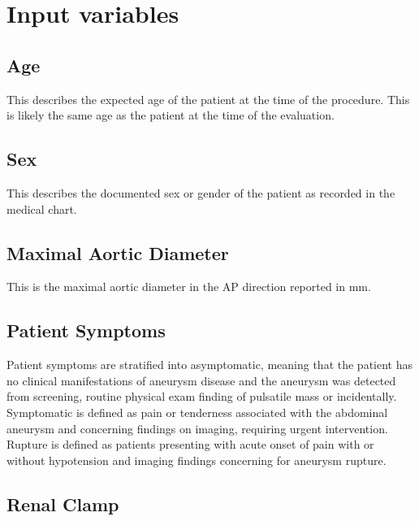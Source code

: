 \documentclass[
]{book}
\begin{document}
\hypertarget{input-variables}{%
\section{Input variables}\label{input-variables}}

\hypertarget{age}{%
\subsection{Age}\label{age}}

This describes the expected age of the patient at the time of the procedure. This is likely the same age as the patient at the time of the evaluation.

\hypertarget{sex}{%
\subsection{Sex}\label{sex}}

This describes the documented sex or gender of the patient as recorded in the medical chart.

\hypertarget{maximal-aortic-diameter}{%
\subsection{Maximal Aortic Diameter}\label{maximal-aortic-diameter}}

This is the maximal aortic diameter in the AP direction reported in mm.

\hypertarget{patient-symptoms}{%
\subsection{Patient Symptoms}\label{patient-symptoms}}

Patient symptoms are stratified into asymptomatic, meaning that the patient has no clinical manifestations of aneurysm disease and the aneurysm was detected from screening, routine physical exam finding of pulsatile mass or incidentally. Symptomatic is defined as pain or tenderness associated with the abdominal aneurysm and concerning findings on imaging, requiring urgent intervention. Rupture is defined as patients presenting with acute onset of pain with or without hypotension and imaging findings concerning for aneurysm rupture.

\hypertarget{renal-clamp}{%
\subsection{Renal Clamp}\label{renal-clamp}}
\end{document}
